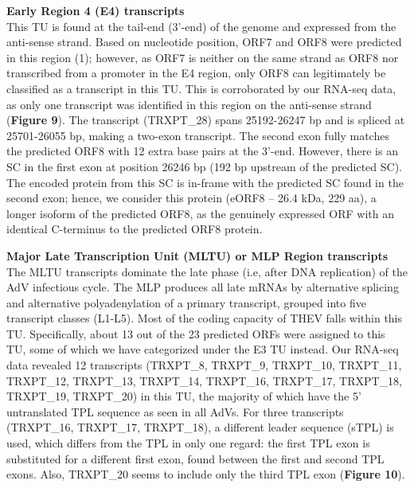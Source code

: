 \documentclass[
]{article}
\begin{document}
\textbf{Early Region 4 (E4) transcripts}\\
This TU is found at the tail-end (3'-end) of the genome and expressed
from the anti-sense strand. Based on nucleotide position, ORF7 and ORF8
were predicted in this region (1); however, as ORF7 is neither on the
same strand as ORF8 nor transcribed from a promoter in the E4 region,
only ORF8 can legitimately be classified as a transcript in this TU.
This is corroborated by our RNA-seq data, as only one transcript was
identified in this region on the anti-sense strand (\textbf{Figure 9}).
The transcript (TRXPT\_28) spans 25192-26247 bp and is spliced at
25701-26055 bp, making a two-exon transcript. The second exon fully
matches the predicted ORF8 with 12 extra base pairs at the 3'-end.
However, there is an SC in the first exon at position 26246 bp (192 bp
upstream of the predicted SC). The encoded protein from this SC is
in-frame with the predicted SC found in the second exon; hence, we
consider this protein (eORF8 -- 26.4 kDa, 229 aa), a longer isoform of
the predicted ORF8, as the genuinely expressed ORF with an identical
C-terminus to the predicted ORF8 protein.

\textbf{Major Late Transcription Unit (MLTU) or MLP Region
transcripts}\\
The MLTU transcripts dominate the late phase (i.e, after DNA
replication) of the AdV infectious cycle. The MLP produces all late
mRNAs by alternative splicing and alternative polyadenylation of a
primary transcript, grouped into five transcript classes (L1-L5). Most
of the coding capacity of THEV falls within this TU. Specifically, about
13 out of the 23 predicted ORFs were assigned to this TU, some of which
we have categorized under the E3 TU instead. Our RNA-seq data revealed
12 transcripts (TRXPT\_8, TRXPT\_9, TRXPT\_10, TRXPT\_11, TRXPT\_12,
TRXPT\_13, TRXPT\_14, TRXPT\_16, TRXPT\_17, TRXPT\_18, TRXPT\_19,
TRXPT\_20) in this TU, the majority of which have the 5' untranslated
TPL sequence as seen in all AdVs. For three transcripts (TRXPT\_16,
TRXPT\_17, TRXPT\_18), a different leader sequence (sTPL) is used, which
differs from the TPL in only one regard: the first TPL exon is
substituted for a different first exon, found between the first and
second TPL exons. Also, TRXPT\_20 seems to include only the third TPL
exon (\textbf{Figure 10}).
\end{document}
